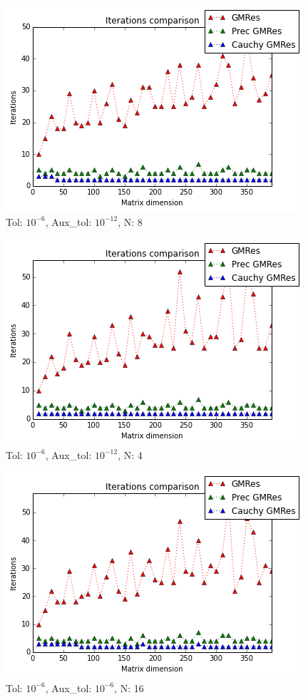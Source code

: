 \documentclass[fleqn]{article}
\begin{document}
\begin{figure}[ht]
    \centering
    \includegraphics[scale=0.4]{images/i4.png}
    \caption{Tol: $10^{-6}$, Aux\_tol: $10^{-12}$, N: 8}
    \label{fig:4}
\end{figure}
\newpage
\begin{figure}[ht]
    \centering
    \includegraphics[scale=0.4]{images/i5.png}
    \caption{Tol: $10^{-6}$, Aux\_tol: $10^{-12}$, N: 4}
    \label{fig:5}
\end{figure}

\begin{figure}[ht]
    \centering
    \includegraphics[scale=0.4]{images/i6.png}
    \caption{Tol: $10^{-6}$, Aux\_tol: $10^{-6}$, N: 16}
    \label{fig:6}
\end{figure}
\end{document}
